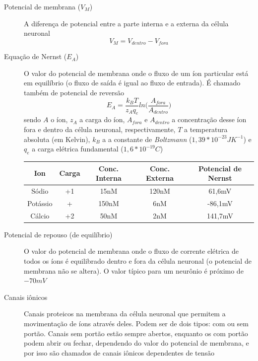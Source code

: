 \begin{description}
	\item[Potencial de membrana ($V_M$)] A diferença de potencial entre a parte interna e a externa da célula neuronal
	$$V_M=V_{dentro}-V_{fora}$$
	\item[Equação de Nernst ($E_A$)] O valor do potencial de membrana onde o fluxo de um íon particular está em equilíbrio (o fluxo de saída é igual ao fluxo de entrada). É chamado também de potencial de reversão
	$$
	E_A=\frac{k_BT}{z_Aq_e}ln\Big(\frac{A_{fora}}{A_{dentro}}\Big)
	$$
	sendo $A$ o íon, $z_A$ a carga do íon, $A_{fora}$ e $A_{dentro}$ a concentração desse íon fora e dentro da célula neuronal, respectivamente, $T$ a temperatura absoluta (em Kelvin), $k_B$ a a constante de \textit{Boltzmann} ($1,39*10^{-23}JK^{-1}$) e $q_e$ a carga elétrica fundamental ($1,6*10^{-19}C$)
	
	\begin{tabular}{ccccc}
		\hline
		Ion & Carga & Conc. Interna & Conc. Externa & Potencial de Nernst \\
		\hline
		Sódio & +1 & 15nM & 120nM & 61,6mV \\
		
		Potássio & + & 150nM & 6nM & -86,1mV \\
		
		Cálcio & +2 & 50nM & 2nM & 141,7mV \\
		\hline
	\end{tabular}
	
	\item[Potencial de repouso (de equilíbrio)] O valor do potencial de membrana onde o fluxo de corrente elétrica de todos os íons é equilibrado dentro e fora da célula neuronal (o potencial de membrana não se altera). O valor típico para um neurônio é próximo de $-70mV$
	\item[Canais iônicos] Canais proteicos na membrana da célula neuronal que permitem a movimentação de íons através deles. Podem ser de dois tipos: com ou sem portão. Canais sem portão estão sempre abertos, enquanto os com portão podem abrir ou fechar, dependendo do valor do potencial de membrana, e por isso são chamados de canais iônicos dependentes de tensão
	

\end{description}
